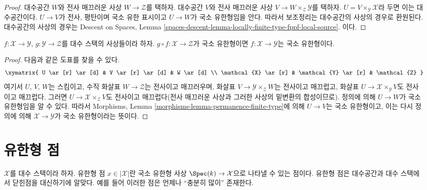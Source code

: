 \begin{proof}
대수공간 $W$와 전사 매끄러운 사상 $W \to \mathcal{Z}$를 택하자.
대수공간 $V$와 전사 매끄러운 사상
$V \to W \times_\mathcal{Z} \mathcal{Y}$를 택하자.
$U = V \times_\mathcal{Y} \mathcal{X}$라 두면 이는 대수공간이다.
$U \to V$가 전사, 평탄이며 국소 유한 표시이고 $U \to W$가 국소
유한형임을 안다. 따라서 보조정리는 대수공간의 사상의 경우로 환원된다.
대수공간의 사상의 경우는 Descent on Spaces, Lemma
\ref{spaces-descent-lemma-locally-finite-type-fppf-local-source}.
이다.
\end{proof}

\begin{lemma}
\label{lemma-finite-type-permanence}
$f : \mathcal{X} \to \mathcal{Y}$,
$g : \mathcal{Y} \to \mathcal{Z}$를 대수 스택의 사상들이라 하자.
$g \circ f : \mathcal{X} \to \mathcal{Z}$가 국소 유한형이면
$f : \mathcal{X} \to \mathcal{Y}$는 국소 유한형이다.
\end{lemma}

\begin{proof}
다음과 같은 도표를 찾을 수 있다.
$$
\xymatrix{
U \ar[r] \ar[d] & V \ar[r] \ar[d] & W \ar[d] \\
\mathcal{X} \ar[r] & \mathcal{Y} \ar[r] & \mathcal{Z}
}
$$
여기서 $U$, $V$, $W$는 스킴이고, 수직 화살표
$W \to \mathcal{Z}$는 전사이고 매끄러우며, 화살표
$V \to \mathcal{Y} \times_\mathcal{Z} W$는 전사이고 매끄럽고,
화살표 $U \to \mathcal{X} \times_\mathcal{Y} V$도 전사이고 매끄럽다.
그러면 $U \to \mathcal{X} \times_\mathcal{Z} V$도 전사이고
매끄럽다(전사 매끄러운 사상과 그러한 사상의 밑변환의 합성이므로).%
정의에 의해 $U \to W$가 국소 유한형임을 알 수 있다. 따라서
Morphisms, Lemma \ref{morphisms-lemma-permanence-finite-type}에 의해
$U \to V$는 국소 유한형이고, 이는 다시 정의에 의해
$\mathcal{X} \to \mathcal{Y}$가 국소 유한형이라는 뜻이다.
\end{proof}










\section{유한형 점}
\label{section-points-finite-type}

\noindent
$\mathcal{X}$를 대수 스택이라 하자.
유한형 점 $x \in |\mathcal{X}|$란 국소 유한형 사상
$\Spec(k) \to \mathcal{X}$으로 나타낼 수 있는 점이다.
유한형 점은 대수공간과 대수 스택에서 닫힌점을 대신하기에 알맞다.
예를 들어 이러한 점은 언제나 ``충분히 많이'' 존재한다.

